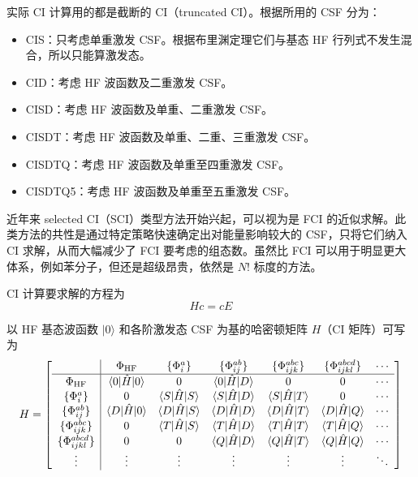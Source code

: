 实际 CI 计算用的都是截断的 CI（truncated CI）。根据所用的 CSF 分为：
\begin{itemize}
  \item CIS：只考虑单重激发 CSF。根据布里渊定理它们与基态 HF 行列式不发生混合，所以只能算激发态。
  \item CID：考虑 HF 波函数及二重激发 CSF。
  \item CISD：考虑 HF 波函数及单重、二重激发 CSF。
  \item CISDT：考虑 HF 波函数及单重、二重、三重激发 CSF。
  \item CISDTQ：考虑 HF 波函数及单重至四重激发 CSF。
  \item CISDTQ5：考虑 HF 波函数及单重至五重激发 CSF。
\end{itemize}

近年来 selected CI（SCI）类型方法开始兴起，可以视为是 FCI 的近似求解。此类方法的共性是通过特定策略快速确定出对能量影响较大的 CSF，只将它们纳入 CI 求解，从而大幅减少了 FCI 要考虑的组态数。虽然比 FCI 可以用于明显更大体系，例如苯分子，但还是超级昂贵，依然是 $N!$ 标度的方法。

CI 计算要求解的方程为
\[
Hc=cE
\]

以 HF 基态波函数 $\lvert 0\rangle$ 和各阶激发态 CSF 为基的哈密顿矩阵 $H$（CI 矩阵）可写为
\begingroup
\setlength{\arraycolsep}{5pt}
\renewcommand{\arraystretch}{1.35}
\[
\resizebox{0.98\textwidth}{!}{$
H=
\left[
\begin{array}{c|cccccc}
 & \Phi_{\mathrm{HF}} & \{\Phi_i^a\} & \{\Phi_{ij}^{ab}\} & \{\Phi_{ijk}^{abc}\} & \{\Phi_{ijkl}^{abcd}\} & \cdots \\
\hline
\Phi_{\mathrm{HF}} & \langle 0|\hat H|0\rangle & 0 & \langle 0|\hat H|D\rangle & 0 & 0 & \cdots \\
\{\Phi_i^a\} & 0 & \langle S|\hat H|S\rangle & \langle S|\hat H|D\rangle & \langle S|\hat H|T\rangle & 0 & \cdots \\
\{\Phi_{ij}^{ab}\} & \langle D|\hat H|0\rangle & \langle D|\hat H|S\rangle & \langle D|\hat H|D\rangle & \langle D|\hat H|T\rangle & \langle D|\hat H|Q\rangle & \cdots \\
\{\Phi_{ijk}^{abc}\} & 0 & \langle T|\hat H|S\rangle & \langle T|\hat H|D\rangle & \langle T|\hat H|T\rangle & \langle T|\hat H|Q\rangle & \cdots \\
\{\Phi_{ijkl}^{abcd}\} & 0 & 0 & \langle Q|\hat H|D\rangle & \langle Q|\hat H|T\rangle & \langle Q|\hat H|Q\rangle & \cdots \\
\vdots & \vdots & \vdots & \vdots & \vdots & \vdots & \ddots
\end{array}
\right]
$}
\]
\endgroup

